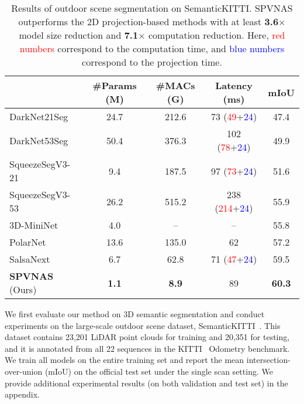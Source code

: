 \documentclass[runningheads]{llncs}
\def\modelshort{SPVNAS\xspace}
\begin{document}
\begin{table}[t]
\setlength{\tabcolsep}{7.5pt}
\small\centering
\begin{tabular}{lcccc}
    \toprule
     & \#Params (M) & \#MACs (G) & Latency (ms) & mIoU \\
    \midrule
    DarkNet21Seg~\cite{behley2019semantickitti} & 24.7 & 212.6 & 73 (\textcolor{red}{49}+\textcolor{blue}{24}) & 47.4 \\
    DarkNet53Seg~\cite{behley2019semantickitti} & 50.4 & 376.3 & 102 (\textcolor{red}{78}+\textcolor{blue}{24}) & 49.9 \\
    SqueezeSegV3-21~\cite{xu2020squeezesegv3} & 9.4 & 187.5 & 97 (\textcolor{red}{73}+\textcolor{blue}{24}) & 51.6 \\
    SqueezeSegV3-53~\cite{xu2020squeezesegv3} & 26.2 & 515.2 & 238 (\textcolor{red}{214}+\textcolor{blue}{24}) & 55.9 \\
    3D-MiniNet~\cite{alonso20203d} & 4.0 & -- & -- & 55.8 \\
    PolarNet~\cite{zhang2020polarnet} & 13.6 & 135.0 & 62 & 57.2 \\
    SalsaNext~\cite{cortinhal2020salsanext} & 6.7 & 62.8 & 71 (\textcolor{red}{47}+\textcolor{blue}{24}) & 59.5 \\
    \midrule
    \textbf{\modelshort} (Ours) & \textbf{1.1} & \textbf{8.9} & 89 & \textbf{60.3} \\
    \bottomrule
\end{tabular}
\caption{Results of outdoor scene segmentation on SemanticKITTI. \modelshort outperforms the 2D projection-based methods with at least \textbf{3.6$\times$} model size reduction and \textbf{7.1$\times$} computation reduction. Here, \textcolor{red}{red numbers} correspond to the computation time, and \textcolor{blue}{blue numbers} correspond to the projection time.}
\label{tab:semantickitti:results:2d}
\end{table} 
We first evaluate our method on 3D semantic segmentation and conduct experiments on the large-scale outdoor scene dataset, SemanticKITTI~\cite{behley2019semantickitti}. This dataset contains 23,201 LiDAR point clouds for training and 20,351 for testing, and it is annotated from all 22 sequences in the KITTI~\cite{geiger2013vision} Odometry benchmark. We train all models on the entire training set and report the mean intersection-over-union (mIoU) on the official test set under the single scan setting. We provide additional experimental results (on both validation and test set) in the appendix.
\end{document}
